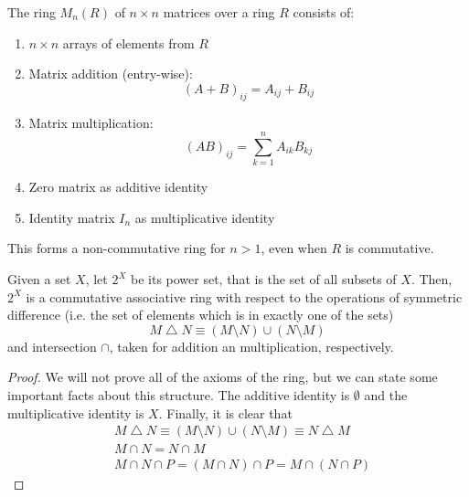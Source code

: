   \begin{definition}[Matrices]
    The ring $M_n(R)$ of $n \times n$ matrices over a ring $R$ consists of:
    \begin{enumerate}
      \item $n \times n$ arrays of elements from $R$
      \item Matrix addition (entry-wise):
      \begin{equation}
        (A + B)_{ij} = A_{ij} + B_{ij}
      \end{equation}
      \item Matrix multiplication:
      \begin{equation}
        (AB)_{ij} = \sum_{k=1}^n A_{ik}B_{kj}
      \end{equation}
      \item Zero matrix as additive identity
      \item Identity matrix $I_n$ as multiplicative identity
    \end{enumerate}
    This forms a non-commutative ring for $n > 1$, even when $R$ is commutative.
  \end{definition}

  \begin{theorem}
    Given a set $X$, let $2^X$ be its power set, that is the set of all subsets of $X$. Then, $2^X$ is a commutative associative ring with respect to the operations of symmetric difference (i.e. the set of elements which is in exactly one of the sets) 
    \begin{equation}
      M \bigtriangleup N \equiv (M \setminus N) \cup (N \setminus M)
    \end{equation}
    and intersection $\cap$, taken for addition an multiplication, respectively. 
  \end{theorem}
  \begin{proof}
    We will not prove all of the axioms of the ring, but we can state some important facts about this structure. The additive identity is $\emptyset$ and the multiplicative identity is $X$. Finally, it is clear that 
    \begin{align*}
      & M \bigtriangleup N \equiv (M \setminus N) \cup (N \setminus M) \equiv N \bigtriangleup M \\
      & M \cap N = N \cap M \\
      & M \cap N \cap P = (M \cap N) \cap P = M \cap (N \cap P)
    \end{align*}
  \end{proof}  

